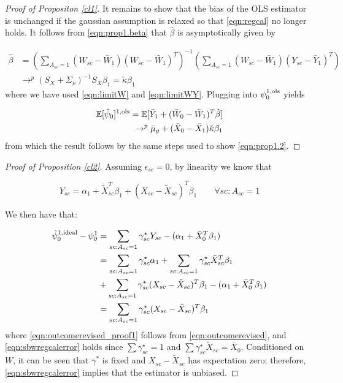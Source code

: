 \documentclass[aoas]{imsart}
\theoremstyle{plain}
\theoremstyle{remark}
\begin{document}
\begin{appendix}
\begin{proof}[Proof of Propositon \ref{cl1}]
It remains to show that the bias of the OLS estimator is unchanged if the gaussian assumption is relaxed so that \eqref{eqn:regcal} no longer holds. It follows from \eqref{eqn:prop1.beta} that $\hat{\beta}$ is asymptotically given by

    \begin{align*}
    \hat{\beta} &= \left(\sum_{A_{sc}=1} (W_{sc} - \bar{W}_1)(W_{sc} - \bar{W}_1)^T \right)^{-1} \left(\sum_{A_{sc}=1} (W_{sc} - \bar{W}_1)(Y_{sc} - \bar{Y}_1)^T\right) \\
     & \rightarrow^p  (S_X + \Sigma_\nu)^{-1}S_X \beta_1 = \check{\kappa} \beta_1
    \end{align*}
where we have used \eqref{eqn:limitW} and \eqref{eqn:limitWY}. Plugging into $\psi_0^{1,\textup{ols}}$ yields

\begin{align*}    
    \mathbb{E}[\hat{\psi}_0]^{1,\textup{ols}} = \mathbb{E}[ \bar{Y}_1 + (\bar{W}_0 - \bar{W}_1)^T \hat{\beta}] \\
    \rightarrow^p  \bar{\mu}_y + (\bar{X}_0 - \bar{X}_1)\check{\kappa} \beta_1
\end{align*}
from which the result follows by the same steps used to show \eqref{eqn:prop1.2}.

\end{proof}

\begin{proof}[Proof of Proposition \ref{cl2}]
Assuming $\epsilon_{sc} = 0$, by linearity we know that

\begin{equation}\label{eqn:outcomerevised}
Y_{sc} = \alpha_1 + \tilde{X}_{sc}^T\beta_1 + (X_{sc} - \tilde{X}_{sc})^T\beta_1 \qquad \forall sc: A_{sc} = 1
\end{equation}

We then have that:

\begin{align}\nonumber
    \hat{\psi}_0^{1,\textup{ideal}} - \psi_0^1 &= \sum_{sc: A_{sc} = 1}\gamma_{sc}^\star Y_{sc} - (\alpha_1 + \bar{X}_0^T\beta_1) \\
    \nonumber &= \sum_{sc: A_{sc} = 1}\gamma_{sc}^\star\alpha_1 + \sum_{sc: A_{sc} = 1}\gamma_{sc}^\star\tilde{X}_{sc}^T\beta_1 \\ 
    &+ \sum_{sc: A_{sc} = 1}\gamma_{sc}^\star(X_{sc} - \tilde{X}_{sc})^T\beta_1 - (\alpha_1 + \bar{X}_0^T\beta_1) \label{eqn:outcomerevised_proof1}\\
    &= \sum_{sc: A_{sc} = 1}\gamma_{sc}^\star(X_{sc} - \tilde{X}_{sc})^T\beta_1\label{eqn:sbwregcalerror}
\end{align}
where \eqref{eqn:outcomerevised_proof1} follows from \eqref{eqn:outcomerevised}, and \eqref{eqn:sbwregcalerror} holds since $\sum \gamma_{sc}^\star = 1$ and $\sum \gamma_{sc}^\star \tilde{X}_{sc} = \bar{X}_0$. Conditioned on $W$, it can be seen that $\gamma^*$ is fixed and $X_{sc} - \tilde{X}_{sc}$ has expectation zero; therefore, \eqref{eqn:sbwregcalerror} implies that the estimator is unbiased.
\end{proof}


\end{appendix}
\end{document}
